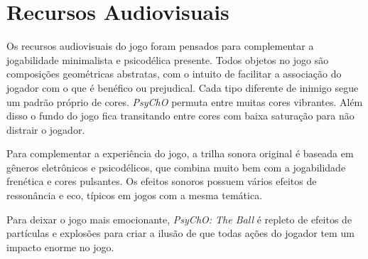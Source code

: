 \section{Recursos Audiovisuais}
\label{sec:audio_visuais}

Os recursos audiovisuais do jogo foram pensados para complementar a jogabilidade minimalista e psicodélica presente. Todos objetos no jogo são composições geométricas abstratas, com o intuito de facilitar a associação do jogador com o que é benéfico ou prejudical. Cada tipo diferente de inimigo segue um padrão próprio de cores. \textit{PsyChO} permuta entre muitas cores vibrantes. Além disso o fundo do jogo fica transitando entre cores com baixa saturação para não distrair o jogador.

Para complementar a experiência do jogo, a trilha sonora original é baseada em gêneros eletrônicos e psicodélicos, que combina muito bem com a jogabilidade frenética e cores pulsantes. Os efeitos sonoros possuem vários efeitos de ressonância e eco, típicos em jogos com a mesma temática.

Para deixar o jogo mais emocionante, \textit{PsyChO: The Ball} é repleto de efeitos de partículas e explosões para criar a ilusão de que todas ações do jogador tem um impacto enorme no jogo.
